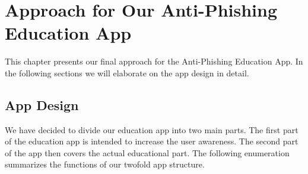 
\section{Approach for Our Anti-Phishing Education App}
\label{s:approach}
This chapter presents our final approach for the Anti-Phishing Education App.
 In the following sections we will elaborate on the app design in detail.

\subsection{App Design}
\label{s:app_design}
We have decided to divide our education app into two main parts.
 The first part of the education app is intended to increase the user awareness.
 The second part of the app then covers the actual educational part.
 The following enumeration summarizes the functions of our twofold app structure.

